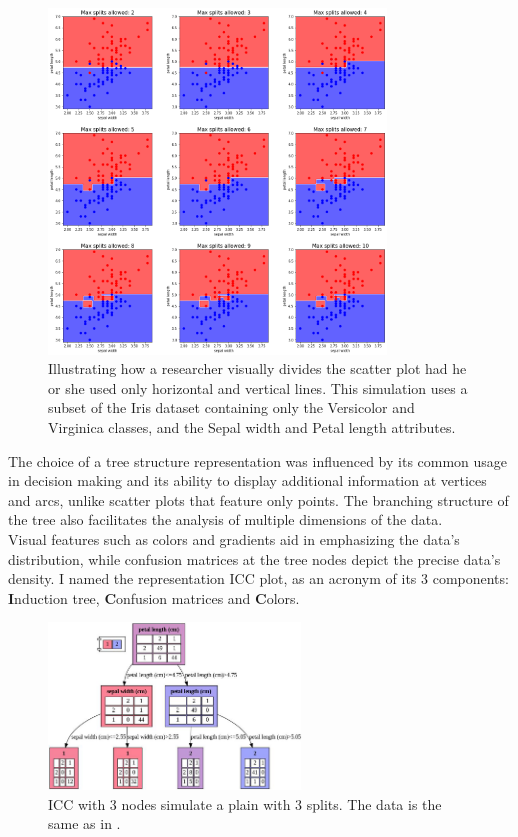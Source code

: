 \documentclass[11pt]{article}
\begin{document}
\begin{figure}[H]
\centering
\includegraphics[width=0.8\textwidth]{scatter_plot_illustration.png}

\caption{Illustrating how a researcher visually divides the scatter plot had he or she used only horizontal and vertical lines. This simulation uses a subset of the Iris dataset containing only the Versicolor and Virginica classes, and the Sepal width and Petal length attributes.}
\label{fig:fig1}

\end{figure}

The choice of a tree structure representation was influenced by its common usage in decision making and its ability to display additional information at vertices and arcs, unlike scatter plots that feature only points. The branching structure of the tree also facilitates the analysis of multiple dimensions of the data. \\
Visual features such as colors and gradients aid in emphasizing the data's distribution, while confusion matrices at the tree nodes depict the precise data's density. I named the representation ICC plot, as an acronym of its 3 components: \textbf{I}nduction tree, \textbf{C}onfusion matrices and \textbf{C}olors.

\begin{figure}[H]
\centering
\includegraphics[width=0.6\textwidth]{icc.png}

\caption{ICC with 3 nodes simulate a plain with 3 splits. The data is the same as in .}
\label{fig:fig2}

\end{figure}
\end{document}
